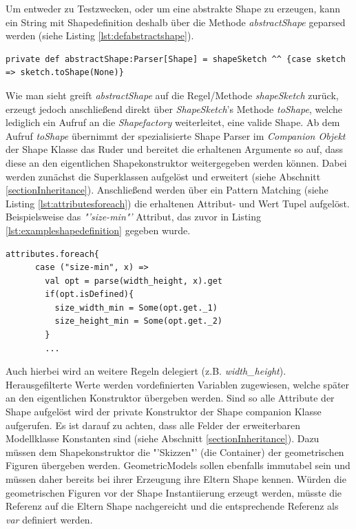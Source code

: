 Um entweder zu Testzwecken, oder um eine abstrakte Shape zu erzeugen, kann ein String mit Shapedefinition deshalb über die Methode \textit{abstractShape} geparsed werden (siehe Listing \ref{lst:defabstractshape}).
\begin{lstlisting}[style=scala, caption = {Auszug aus Code Methode zum direkten Parsen von Shapes}, label = {lst:defabstractshape}]
private def abstractShape:Parser[Shape] = shapeSketch ^^ {case sketch => sketch.toShape(None)}
\end{lstlisting}Wie man sieht greift \textit{abstractShape} auf die Regel/Methode \textit{shapeSketch} zurück, erzeugt jedoch anschließend direkt über \textit{ShapeSketch}'s Methode \textit{toShape}, welche lediglich ein Aufruf an die \textit{Shapefactory} weiterleitet, eine valide Shape. Ab dem Aufruf \textit{toShape} übernimmt der spezialisierte Shape Parser im \textit{Companion Objekt} der Shape Klasse das Ruder und bereitet die erhaltenen Argumente so auf, dass diese an den eigentlichen Shapekonstruktor weitergegeben werden können. Dabei werden zunächst die Superklassen aufgelöst und erweitert (siehe Abschnitt \ref{sectionInheritance}). Anschließend werden über ein Pattern Matching (siehe Listing \ref{lst:attributesforeach}) die erhaltenen Attribut- und Wert Tupel aufgelöst. Beispielsweise das \textit{"'size-min"'} Attribut, das zuvor in Listing \ref{lst:exampleshapedefinition} gegeben wurde. 
\begin{lstlisting}[style=scala, caption = {Auszug aus Code Iterieren durch Attribute mit Pattern Matching}, label = {lst:attributesforeach}]
attributes.foreach{
      case ("size-min", x) =>
        val opt = parse(width_height, x).get
        if(opt.isDefined){
          size_width_min = Some(opt.get._1)
          size_height_min = Some(opt.get._2)
        }
        ...
\end{lstlisting}Auch hierbei wird an weitere Regeln delegiert (z.B. \textit{width\_height}). Herausgefilterte Werte werden vordefinierten Variablen zugewiesen, welche später an den eigentlichen Konstruktor übergeben werden. Sind so alle Attribute der Shape aufgelöst wird der private Konstruktor der Shape companion Klasse aufgerufen. Es ist darauf zu achten, dass alle Felder der erweiterbaren Modellklasse Konstanten sind (siehe Abschnitt \ref{sectionInheritance}). Dazu müssen dem Shapekonstruktor die "'Skizzen"' (die Container) der geometrischen Figuren übergeben werden. GeometricModels sollen ebenfalls immutabel sein und müssen daher bereits bei ihrer Erzeugung ihre Eltern Shape kennen. Würden die geometrischen Figuren vor der Shape Instantiierung erzeugt werden, müsste die Referenz auf die Eltern Shape nachgereicht  und die entsprechende Referenz als \textit{var} definiert werden.
